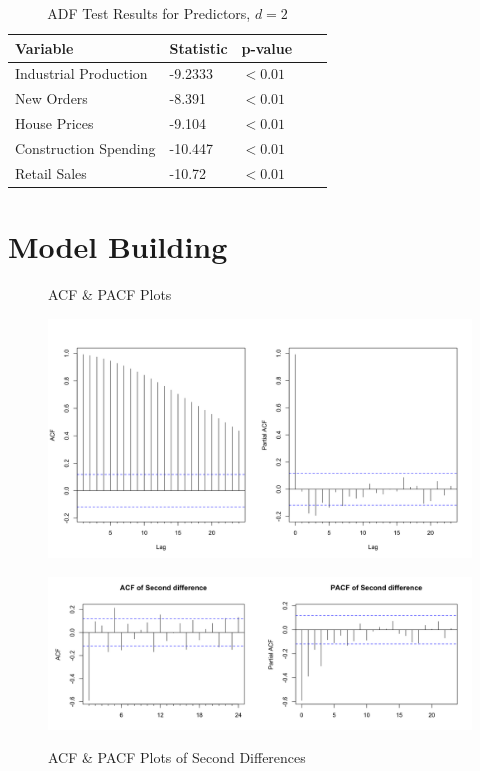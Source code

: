 \documentclass[twoside,twocolumn]{article}
\begin{document}
\begin{table}[H]
		 \centering
		 \caption{ADF Test Results for Predictors, \(d=2\)}
		 \label{tab:ADF2}
		 \begin{tabular}{lllll}
		 \hline
		 \textbf{Variable} & \textbf{Statistic}  & \textbf{p-value}\\ \hline
		  Industrial Production & -9.2333  &\( < 0.01\)\\
		  New Orders &  -8.391  & \( < 0.01\)\\
		  House Prices &  -9.104  & \( < 0.01\)\\
		  Construction Spending &  -10.447 &  \( < 0.01\)\\
		  Retail Sales &  -10.72 &  \( < 0.01\)\\ \hline
		 \end{tabular}
		 \end{table}







\section{Model Building}


    \begin{figure}[hbt]
    	\centering
     	\caption{ACF \& PACF Plots}
     	\includegraphics[width=\linewidth]{images/acfpacf}
     	\label{fig:acfpacf}
     	\caption{ACF \& PACF Plots of Second Differences}
     	\includegraphics[width=\linewidth]{images/acfpacf2d}
     	\label{fig:acfpacf2}
      \end{figure}
\end{document}
